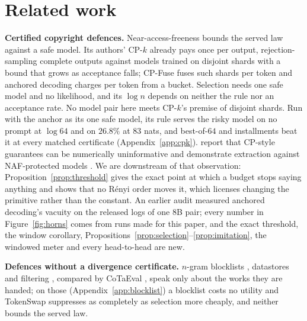 
\section{Related work}\label{sec:related}

\textbf{Certified copyright defences.} Near-access-freeness \citep{vyas2023provable} bounds the served law
against a safe model. Its authors' CP-$k$ already pays once per output, rejection-sampling complete
outputs against models trained on disjoint shards with a bound that grows as acceptance falls; CP-Fuse
\citep{abad2025cpfuse} fuses such shards per token and anchored decoding \citep{he2026anchored} charges per
token from a bucket. Selection needs one safe model and no likelihood, and its $\log n$ depends on neither
the rule nor an acceptance rate. No model pair here meets CP-$k$'s premise of disjoint shards. Run with
the anchor as its one safe model, its rule serves the risky model on no prompt at $\log 64$ and on $26.8\%$
at $83$ nats, and best-of-$64$ and installments beat it at every matched certificate (Appendix~\ref{app:cpk}).
\citet{segal2026provably} report that CP-style guarantees can be numerically uninformative and demonstrate
extraction against NAF-protected models \citep[see also][]{cohen2026barriers}. We are downstream of that
observation: Proposition~\ref{prop:threshold} gives the exact point at which a budget stops saying anything
and shows that no R\'enyi order moves it, which licenses changing the primitive rather than the constant.
An earlier audit \citep{vijayavallabh2026audit} measured anchored decoding's vacuity on the released logs of
one $8$B pair; every number in Figure~\ref{fig:horns} comes from runs made for this paper, and the exact
threshold, the window corollary, Propositions~\ref{prop:selection}--\ref{prop:imitation}, the windowed
meter and every head-to-head are new.

\textbf{Defences without a divergence certificate.} $n$-gram blocklists \citep{ippolito2023preventing},
datastores \citep{min2024silo,golatkar2024cpr} and filtering \citep{liu2024shield}, compared by CoTaEval
\citep{wei2024cotaeval}, speak only about the works they are handed; on those (Appendix~\ref{app:blocklist}) a blocklist costs no utility and TokenSwap
\citep{prashant2025tokenswap} suppresses as completely as selection more cheaply, and neither bounds the
served law.

